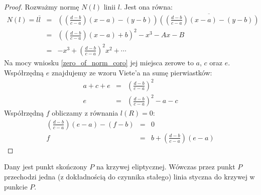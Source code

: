 \begin{proof}
Rozważmy normę $N(l)$ linii $l$. Jest ona równa:
\begin{eqnarray*}
N(l) = l\overline{l}
& = & \left(\left(\frac{d-b}{c-a}\right)(x - a) - (y - b)\right)
      \overline{\left(\left(\frac{d-b}{c-a}\right)(x - a) - (y - b)\right)} \\
& = & \left(\left(\frac{d-b}{c-a}\right)(x-a) + b\right)^2 - x^3 - Ax - B \\
& = & -x^3 + \left(\frac{d-b}{c-a}\right)^2x^2 + \cdots
\end{eqnarray*}
Na mocy wniosku \ref{zero_of_norm_coro}
jej miejsca zerowe to $a$, $c$ oraz $e$.
Współrzędną $e$ znajdujemy ze wzoru Viete'a na sumę pierwiastków:
\begin{eqnarray*}
a + c + e & = & \left(\frac{d-b}{c-a}\right)^2 \\
        e & = & \left(\frac{d-b}{c-a}\right)^2 - a - c
\end{eqnarray*}
Współrzędną $f$ obliczamy z równania $l(R) = 0$:
\begin{eqnarray*}
\left(\frac{d-b}{c-a}\right)(e - a) - (f - b) & = & 0 \\
f & = & b + \left(\frac{d-b}{c-a}\right)(e-a)
\end{eqnarray*}
\end{proof}

\begin{theorem}\label{line_tangent_at_point_theorem}
Dany jest punkt skończony $P$ na krzywej eliptycznej.
Wówczas przez punkt $P$ przechodzi jedna (z dokładnością do czynnika stałego)
linia styczna do krzywej w punkcie $P$.
\end{theorem}

